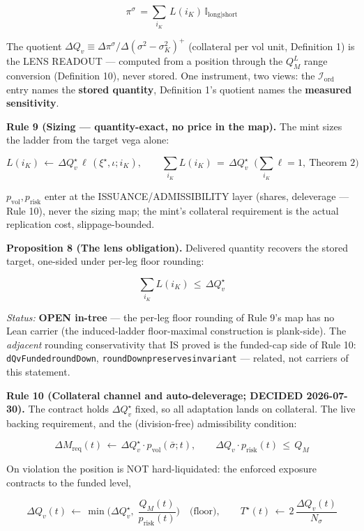 \documentclass[11pt]{article}
\renewcommand{\_}{\textunderscore\allowbreak}
\begin{document}
\[
    \pi^{\sigma} \, = \sum_{i_K} \, L(i_K) \, \mathbb{I}_{\text{long|short}}
\]

The quotient \(\Delta Q_v \equiv \Delta\pi^{\sigma}/\Delta(\sigma^2-\sigma^2_K)^{+}\) (collateral per vol unit, Definition 1) is the LENS READOUT --- computed from a position through the \(Q_M^L\) range conversion (Definition 10), never stored. One instrument, two views: the \(\mathcal{I}_{\text{ord}}\) entry names the \textbf{stored quantity}, Definition 1's quotient names the \textbf{measured sensitivity}.

\textbf{Rule 9 (Sizing --- quantity-exact, no price in the map).} The mint sizes the ladder from the target vega alone:

\[
    L(i_K) \,\leftarrow\, \Delta Q_v^{\star}\,\ell\,(\xi^{\star}, \iota; i_K), \qquad \sum_{i_K} L(i_K) \,=\, \Delta Q_v^{\star} \;\; \big(\textstyle\sum_{i_K}\ell = 1,\ \text{Theorem 2}\big)
\]

\(p_{\text{vol}}, p_{\text{risk}}\) enter at the ISSUANCE/ADMISSIBILITY layer (shares, deleverage --- Rule 10), never the sizing map; the mint's collateral requirement is the actual replication cost, slippage-bounded.

\textbf{Proposition 8 (The lens obligation).} Delivered quantity recovers the stored target, one-sided under per-leg floor rounding:

\[
    \sum_{i_K} L(i_K) \,\leq\, \Delta Q_v^{\star}
\]

\emph{Status:} \textbf{OPEN in-tree} --- the per-leg floor rounding of Rule 9's map has no Lean carrier (the induced-ladder floor-maximal construction is plank-side). The \emph{adjacent} rounding conservativity that IS proved is the funded-cap side of Rule 10: \texttt{dQvFunded\_roundDown}, \texttt{roundDown\_preserves\_invariant} --- related, not carriers of this statement.

\textbf{Rule 10 (Collateral channel and auto-deleverage; DECIDED 2026-07-30).} The contract holds \(\Delta Q_v^{\star}\) fixed, so all adaptation lands on collateral. The live backing requirement, and the (division-free) admissibility condition:

\[
    \Delta M_{\text{req}}(t) \,\leftarrow\, \Delta Q_v^{\star}\cdot p_{\text{vol}}(\bar\sigma; t), \qquad \Delta Q_v \cdot p_{\text{risk}}(t) \,\leq\, Q_M
\]

On violation the position is NOT hard-liquidated: the enforced exposure contracts to the funded level,

\[
    \Delta Q_v(t) \,\leftarrow\, \min\Big(\Delta Q_v^{\star},\; \frac{Q_M(t)}{p_{\text{risk}}(t)}\Big) \quad \text{(floor)}, \qquad T^{\star}(t) \,\leftarrow\, 2\,\frac{\Delta Q_v(t)}{N_\sigma}
\]
\end{document}
